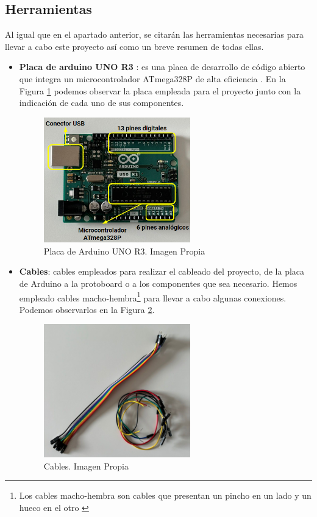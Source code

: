 \subsection{Herramientas}
Al igual que en el apartado anterior, se citarán las herramientas necesarias para llevar a cabo este proyecto así como un breve resumen de todas ellas.

\begin{itemize}
    \item \textbf{Placa de arduino UNO R3} \cite{placa}: es una placa de desarrollo de código abierto que integra un microcontrolador ATmega328P de alta eficiencia \cite{placa}. En la Figura \ref{fig:placa_Arduino} podemos observar la placa empleada para el proyecto junto con la indicación de cada uno de sus componentes.
    \begin{figure}[h]
    \centering
    \includegraphics[width=0.6\textwidth]{img/PLACAPARTES.PNG}
    \caption{Placa de Arduino UNO R3. Imagen Propia}
    \label{fig:placa_Arduino}
\end{figure}

    \item \textbf{Cables}: cables empleados para realizar el cableado del proyecto, de la placa de Arduino a la protoboard o a los componentes que sea necesario. Hemos empleado cables macho-hembra\footnote{Los cables macho-hembra son cables que presentan un pincho en un lado y un hueco en el otro \cite{cables}} para llevar a cabo algunas conexiones. Podemos observarlos en la Figura \ref{fig:cables}.
    \begin{figure}[h]
    \centering
    \includegraphics[width=0.6\textwidth]{img/cables.jpg}
    \caption{Cables. Imagen Propia}
    \label{fig:cables}
\end{figure}


\end{itemize}
